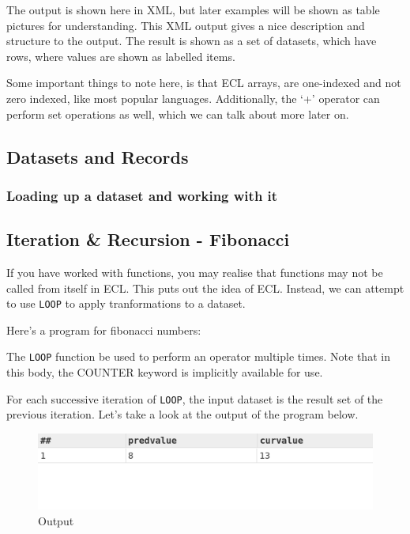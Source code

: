 \documentclass[a4paper,oneside,12pt]{book}
\begin{document}


\pagebreak
The output is shown here in XML, but later examples will be shown as table pictures for understanding.
This XML output gives a nice description and structure to the output. The result is shown as a set of datasets, which have rows, where values are shown as labelled items.

Some important things to note here, is that ECL arrays, are one-indexed and not zero indexed, like most popular languages. 
Additionally, the `+' operator can perform set operations as well, which we can talk about more later on.




\subsection{Datasets and Records}

\subsubsection{Loading up a dataset and working with it}



\subsection{Iteration \& Recursion - Fibonacci}

If you have worked with functions, you may realise that functions may not be called from itself in ECL. This puts out the idea of ECL.
Instead, we can attempt to use \lstinline{LOOP} to apply tranformations to a dataset.

Here's a program for fibonacci numbers:


The \lstinline!LOOP! function be used to perform an operator multiple times. Note that in this body, the COUNTER keyword is implicitly available for use.

For each successive iteration of \lstinline{LOOP}, the input dataset is the result set of the previous iteration. Let's take a look at the output of the program below.

\begin{figure}[h]
    \centering
    \includegraphics[width=.6\linewidth]{../output/43/op.png}
    \caption{Output}
\end{figure}
\end{document}
